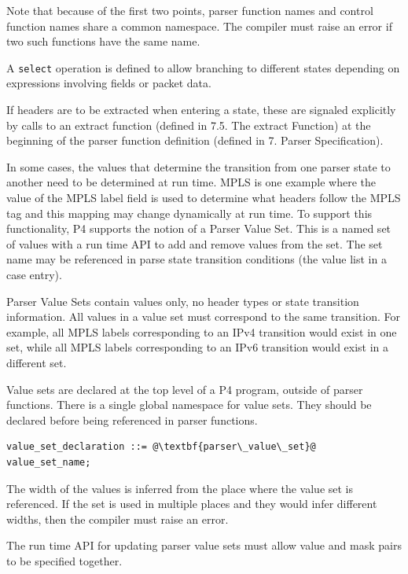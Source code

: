 \documentclass[12pt]{article}
\begin{document}
Note that because of the first two points, parser function names and
control function names share a common namespace.  The compiler must
raise an error if two such functions have the same name.

A \texttt{select} operation is defined to allow branching to different
states depending on expressions involving fields or packet data.

If headers are to be extracted when entering a state, these are
signaled explicitly by calls to an extract function (defined in
7.5. The extract Function) at the beginning of the parser function
definition (defined in 7. Parser Specification).


In some cases, the values that determine the transition from one
parser state to another need to be determined at run time. MPLS is one
example where the value of the MPLS label field is used to determine
what headers follow the MPLS tag and this mapping may change
dynamically at run time. To support this functionality, P4 supports
the notion of a Parser Value Set. This is a named set of values with a
run time API to add and remove values from the set. The set name may
be referenced in parse state transition conditions (the value list in
a case entry).

Parser Value Sets contain values only, no header types or state transition
information. All values in a value set must correspond to the same transition.
For example, all MPLS labels corresponding to an IPv4 transition would exist
in one set, while all MPLS labels corresponding to an IPv6 transition would
exist in a different set.

Value sets are declared at the top level of a P4 program, outside of parser
functions. There is a single global namespace for value sets. They should
be declared before being referenced in parser functions.

\begin{lstlisting}[frame=single,backgroundcolor=\color{bnfgreen},escapechar=\@]
value_set_declaration ::= @\textbf{parser\_value\_set}@ value_set_name;
\end{lstlisting}

The width of the values is inferred from the place where the value set is
referenced.  If the set is used in multiple places and they would infer
different widths, then the compiler must raise an error.

The run time API for updating parser value sets must allow value and mask
pairs to be specified together.
\end{document}
